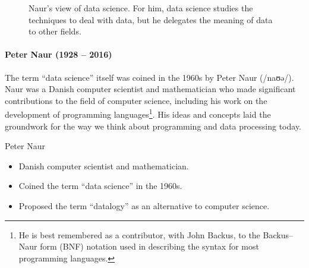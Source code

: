\def\naurds{(0,0) circle (20mm)}
\def\naurcs{(0:5mm) circle (15mm)}
\def\naurde{(0:40mm) circle (15mm)}



\begin{figure}
  \centering
  \caption{
    Naur's view of data science.  For him, data science studies the techniques to deal
    with data, but he delegates the meaning of data to other fields.
  }
  \label{fig:naur}
\end{figure}

\paragraph{Peter Naur (1928 -- 2016)}

The term ``data science'' itself was coined in the 1960s by Peter Naur (/naʊə/). Naur was
a Danish computer scientist and mathematician who made significant contributions to the
field of computer science, including his work on the development of programming
languages\footnote{He is best remembered as a contributor, with John Backus, to the
Backus–Naur form (BNF) notation used in describing the syntax for most programming
languages.}.
His ideas and concepts laid the groundwork for the way we think about programming and data
processing today.

\begin{mainbox}{Peter Naur}
  \begin{itemize}
    \item Danish computer scientist and mathematician.
    \item Coined the term ``data science'' in the 1960s.
    \item Proposed the term ``datalogy'' as an alternative to computer science.
  \end{itemize}
\end{mainbox}

